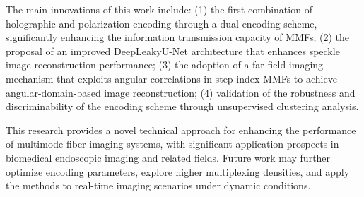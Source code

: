 The main innovations of this work include: (1) the first combination of holographic and polarization encoding through a dual-encoding scheme, significantly enhancing the information transmission capacity of MMFs; (2) the proposal of an improved DeepLeakyU-Net architecture that enhances speckle image reconstruction performance; (3) the adoption of a far-field imaging mechanism that exploits angular correlations in step-index MMFs to achieve angular-domain-based image reconstruction; (4) validation of the robustness and discriminability of the encoding scheme through unsupervised clustering analysis.

This research provides a novel technical approach for enhancing the performance of multimode fiber imaging systems, with significant application prospects in biomedical endoscopic imaging and related fields. Future work may further optimize encoding parameters, explore higher multiplexing densities, and apply the methods to real-time imaging scenarios under dynamic conditions.


\pagestyle{enfrontmatterstyle}%
\cleardoublepage\pagestyle{frontmatterstyle}%

